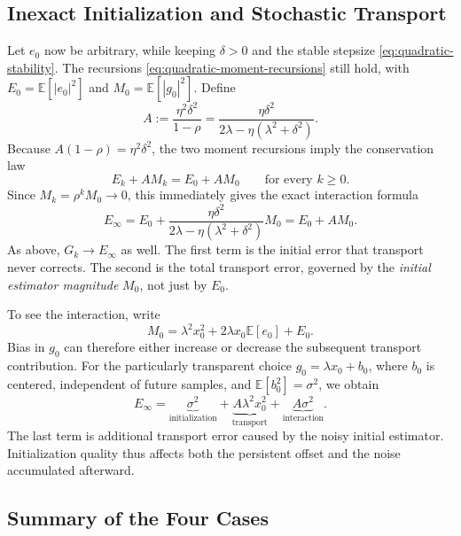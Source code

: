 \subsection{Inexact Initialization and Stochastic Transport}
\label{subsec:inexact-init-stochastic-transport}

Let $e_0$ now be arbitrary, while keeping $\delta>0$ and the stable
stepsize \eqref{eq:quadratic-stability}. The recursions
\eqref{eq:quadratic-moment-recursions} still hold, with
$E_0=\mathbb{E}[|e_0|^2]$ and $M_0=\mathbb{E}[|g_0|^2]$. Define
\begin{equation}
\label{eq:quadratic-A}
A:=\frac{\eta^2\delta^2}{1-\rho}
 =\frac{\eta\delta^2}
        {2\lambda-\eta(\lambda^2+\delta^2)}.
\end{equation}
Because $A(1-\rho)=\eta^2\delta^2$, the two moment recursions imply
the conservation law
\begin{equation}
\label{eq:quadratic-conservation}
E_k+A M_k=E_0+A M_0
\qquad\text{for every }k\geq0.
\end{equation}
Since $M_k=\rho^kM_0\to0$, this immediately gives the exact
interaction formula
\begin{equation}
\label{eq:quadratic-interaction}
\boxed{
E_\infty
=E_0+
\frac{\eta\delta^2}
     {2\lambda-\eta(\lambda^2+\delta^2)}M_0
=E_0+A M_0.}
\end{equation}
As above, $G_k\to E_\infty$ as well. The first term is the initial
error that transport never corrects. The second is the total
transport error, governed by the \emph{initial estimator magnitude}
$M_0$, not just by $E_0$.

To see the interaction, write
\[
M_0=\lambda^2x_0^2
    +2\lambda x_0\mathbb{E}[e_0]+E_0.
\]
Bias in $g_0$ can therefore either increase or decrease the
subsequent transport contribution. For the particularly transparent
choice $g_0=\lambda x_0+b_0$, where $b_0$ is centered, independent
of future samples, and $\mathbb{E}[b_0^2]=\sigma^2$, we obtain
\begin{equation}
\label{eq:quadratic-three-contributions}
E_\infty
=\underbrace{\sigma^2}_{\text{initialization}}
 +\underbrace{A\lambda^2x_0^2}_{\text{transport}}
 +\underbrace{A\sigma^2}_{\text{interaction}}.
\end{equation}
The last term is additional transport error caused by the noisy
initial estimator. Initialization quality thus affects both the
persistent offset and the noise accumulated afterward.

\subsection{Summary of the Four Cases}
\label{subsec:four-case-summary}

